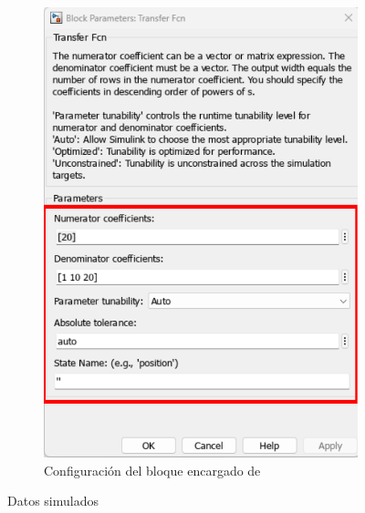 \begin{figure}[htbp]
\begin{subfigure}[b]{0.45\textwidth}
        \includegraphics[width=\textwidth]{fig/Capitulo5/Caso_de_estudio_PID/config_transfer_function.pdf}
        \caption{Configuración del bloque encargado de }
        \label{fig:oe_sim}
    \end{subfigure}
    \caption{Datos simulados}
    \label{fig:data_simulated}
\end{figure}

